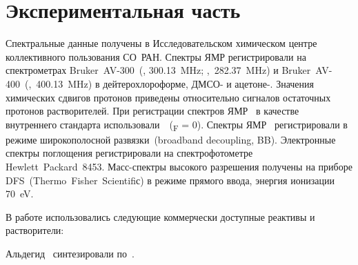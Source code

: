 \section{Экспериментальная часть}

Спектральные данные получены в Исследовательском химическом центре коллективного пользования СО~РАН. 
Спектры ЯМР регистрировали на спектрометрах Bruker~AV-300~(, \SI{300.13}{\mega\hertz}; ,~\SI{282.37}{\mega\hertz}) и Bruker~AV-400~(,~\SI{400.13}{\mega\hertz}) в дейтерохлороформе, ДМСО- и ацетоне-. 
Значения химических сдвигов протонов приведены относительно сигналов остаточных протонов растворителей. 
При регистрации спектров ЯМР~ в качестве внутреннего стандарта использовали~~(\chemdelta{}\textsubscript{F} = \SI{0}{\ppm}). 
Спектры ЯМР~ регистрировали в режиме широкополосной развязки~(broadband decoupling, BB). 
Электронные спектры поглощения регистрировали на спектрофотометре Hewlett~Packard~8453.
Масс-спектры высокого разрешения получены на приборе DFS~(Thermo~Fisher~Scientifiс) в режиме прямого ввода, энергия ионизации \SI{70}{\electronvolt}.

В работе использовались следующие коммерчески доступные реактивы и растворители: 

Альдегид~ синтезировали по~\cite{2016a,2010}.

